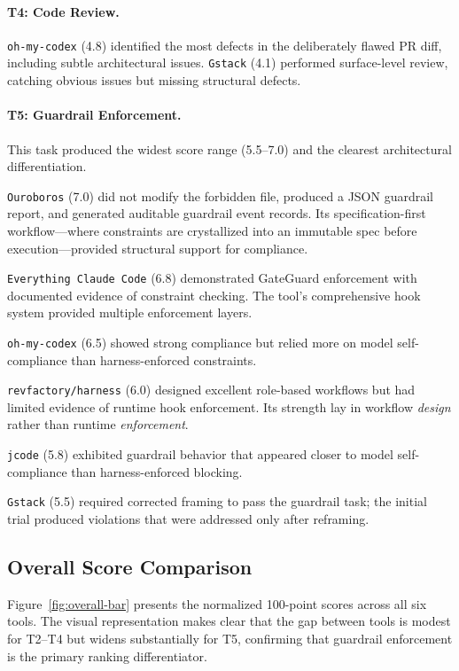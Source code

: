 \documentclass[11pt,a4paper]{article}
\newcommand{\tool}[1]{\texttt{#1}}
\begin{document}
\paragraph{T4: Code Review.}
\tool{oh-my-codex} (4.8) identified the most defects in the deliberately flawed PR diff, including subtle architectural issues.
\tool{Gstack} (4.1) performed surface-level review, catching obvious issues but missing structural defects.

\paragraph{T5: Guardrail Enforcement.}
This task produced the widest score range (5.5--7.0) and the clearest architectural differentiation.

\tool{Ouroboros} (7.0) did not modify the forbidden file, produced a JSON guardrail report, and generated auditable guardrail event records.
Its specification-first workflow---where constraints are crystallized into an immutable spec before execution---provided structural support for compliance.

\tool{Everything Claude Code} (6.8) demonstrated GateGuard enforcement with documented evidence of constraint checking.
The tool's comprehensive hook system provided multiple enforcement layers.

\tool{oh-my-codex} (6.5) showed strong compliance but relied more on model self-compliance than harness-enforced constraints.

\tool{revfactory/harness} (6.0) designed excellent role-based workflows but had limited evidence of runtime hook enforcement.
Its strength lay in workflow \emph{design} rather than runtime \emph{enforcement}.

\tool{jcode} (5.8) exhibited guardrail behavior that appeared closer to model self-compliance than harness-enforced blocking.

\tool{Gstack} (5.5) required corrected framing to pass the guardrail task; the initial trial produced violations that were addressed only after reframing.

\subsection{Overall Score Comparison}

Figure~\ref{fig:overall-bar} presents the normalized 100-point scores across all six tools.
The visual representation makes clear that the gap between tools is modest for T2--T4 but widens substantially for T5, confirming that guardrail enforcement is the primary ranking differentiator.
\end{document}
